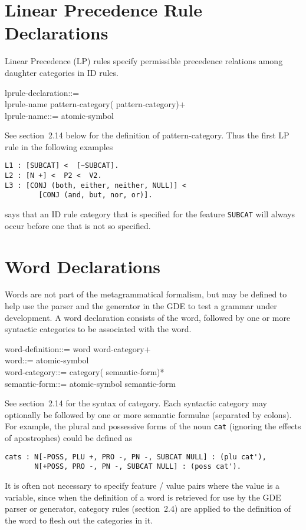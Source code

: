 \section{Linear Precedence Rule Declarations}

Linear Precedence (LP) rules specify permissible precedence relations
among daughter categories in ID rules.
\begin{display}
\la lprule-declaration\ra ::=\\
\cont \la lprule-name\ra \lit{:} \la pattern-category\ra (\lit{\la} \la pattern-category\ran)+ \\
\la lprule-name\ra ::= \la atomic-symbol\ra
\end{display}
See section~2.14 below for the definition of \la pattern-category\ran.  Thus
the first LP rule in the following examples
\begin{ex}
\begin{verbatim}
L1 : [SUBCAT] <  [~SUBCAT].
L2 : [N +] <  P2 <  V2.
L3 : [CONJ (both, either, neither, NULL)] <  
        [CONJ (and, but, nor, or)].
\end{verbatim}
\end{ex}
says that an ID rule category that is specified for the feature {\tt SUBCAT}
will always occur before one that is not so specified.

\section{Word Declarations}

Words are not part of the metagrammatical formalism, but may be defined
to help use the parser and the generator in the GDE to test a grammar
under development. A word declaration consists of the word, followed by
one or more syntactic categories to be associated with the word.
\begin{display}
\la word-definition\ra ::= \la word\ra \lit{:} \la word-category\ran+ \\
\la word\ra ::= \la atomic-symbol\ra\\
\la word-category\ra ::= \la category\ra (\lit{:} \la semantic-form\ran)*\\
\la semantic-form\ra ::= \la atomic-symbol\ra \alt \lit{(} \la semantic-form\ran* \lit{)}
\end{display}
See section~2.14 for the syntax of \la category\ran. Each syntactic
category may optionally be followed by one or more semantic formulae
(separated by colons). For example, the plural
and possessive forms of the noun {\tt cat} (ignoring the effects of
apostrophes) could be defined as
\begin{ex}
\begin{verbatim}
cats : N[-POSS, PLU +, PRO -, PN -, SUBCAT NULL] : (plu cat'),
       N[+POSS, PRO -, PN -, SUBCAT NULL] : (poss cat').
\end{verbatim}
\end{ex}
It is often not necessary to specify feature / value pairs where the value is
a variable, since when the definition of a word is retrieved for use by
the GDE parser or generator, category rules (section~2.4) are
applied to the definition of the word to flesh out the categories in
it.

